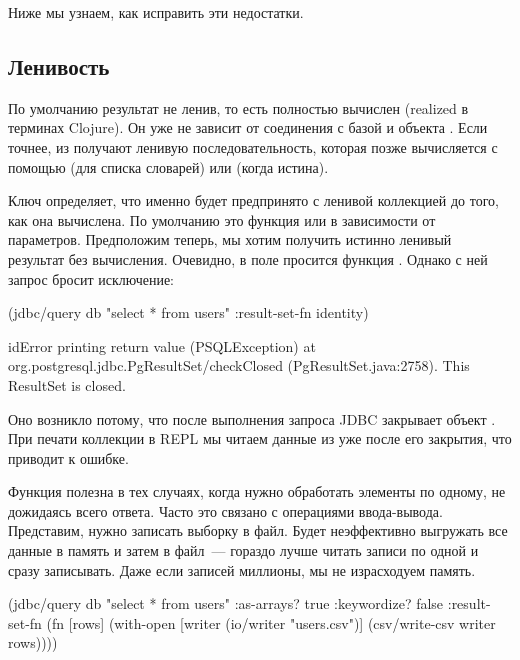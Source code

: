 Ниже мы узнаем, как исправить эти недостатки.

\subsection{Ленивость}

По умолчанию результат  не ленив, то есть полностью вычислен (realized в терминах Clojure). Он уже не зависит от соединения с базой и объекта . Если точнее, из  получают ленивую последовательность, которая позже вычисляется с помощью  (для списка словарей) или  (когда  истина).

Ключ  определяет, что именно будет предпринято с ленивой коллекцией до того, как она вычислена. По умолчанию это функция  или  в зависимости от параметров. Предположим теперь, мы хотим получить истинно ленивый результат без вычисления. Очевидно, в поле  просится функция . Однако с ней запрос бросит исключение:

\begin{english}
  \begin{clojure}
(jdbc/query db "select * from users" {:result-set-fn identity})

idError printing return value (PSQLException) at org.postgresql.jdbc.PgResultSet/checkClosed (PgResultSet.java:2758).
This ResultSet is closed.
  \end{clojure}
\end{english}

Оно возникло потому, что после выполнения запроса JDBC закрывает объект . При печати коллекции в REPL мы читаем данные из  уже после его закрытия, что приводит к ошибке.

Функция  полезна в тех случаях, когда нужно обработать элементы по одному, не дожидаясь всего ответа. Часто это связано с операциями ввода-вывода. Представим, нужно записать выборку в файл. Будет неэффективно выгружать все данные в память и затем в файл~--- гораздо лучше читать записи по одной и сразу записывать. Даже если записей миллионы, мы не израсходуем память.

\begin{english}
  \begin{clojure}
(jdbc/query db
            "select * from users"
            {:as-arrays? true
             :keywordize? false
             :result-set-fn
             (fn [rows]
               (with-open [writer
                           (io/writer "users.csv")]
                 (csv/write-csv writer rows)))})
  \end{clojure}
\end{english}

